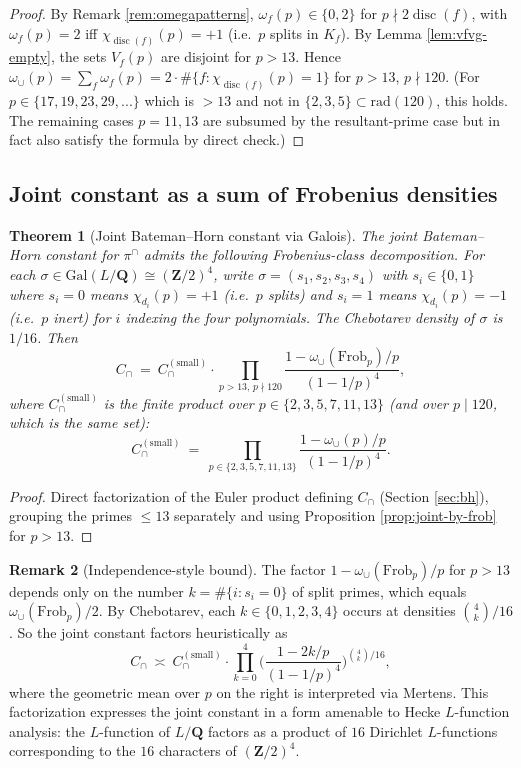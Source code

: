 \documentclass[11pt]{article}
\newtheorem{theorem}{Theorem}[section]
\theoremstyle{definition}
\newtheorem{remark}[theorem]{Remark}
\newcommand{\Z}{\mathbf{Z}}
\newcommand{\Q}{\mathbf{Q}}
\DeclareMathOperator{\disc}{disc}
\begin{document}
\begin{proof}
By Remark \ref{rem:omegapatterns}, $\omega_f(p)\in\{0,2\}$ for $p\nmid 2\disc(f)$, with $\omega_f(p)=2$ iff $\chi_{\disc(f)}(p)=+1$ (i.e.\ $p$ splits in $K_f$). By Lemma \ref{lem:vfvg-empty}, the sets $V_f(p)$ are disjoint for $p>13$. Hence $\omega_\cup(p)=\sum_f\omega_f(p)=2\cdot\#\{f:\chi_{\disc(f)}(p)=1\}$ for $p>13$, $p\nmid 120$. (For $p\in\{17,19,23,29,...\}$ which is $>13$ and not in $\{2,3,5\}\subset\mathrm{rad}(120)$, this holds. The remaining cases $p=11,13$ are subsumed by the resultant-prime case but in fact also satisfy the formula by direct check.)
\end{proof}

\subsection{Joint constant as a sum of Frobenius densities}

\begin{theorem}[Joint Bateman--Horn constant via Galois]\label{thm:joint-by-galois}
The joint Bateman--Horn constant for $\pi^\cap$ admits the following Frobenius-class decomposition. For each $\sigma\in\mathrm{Gal}(L/\Q)\cong(\Z/2)^4$, write $\sigma=(s_1,s_2,s_3,s_4)$ with $s_i\in\{0,1\}$ where $s_i=0$ means $\chi_{d_i}(p)=+1$ (i.e.\ $p$ splits) and $s_i=1$ means $\chi_{d_i}(p)=-1$ (i.e.\ $p$ inert) for $i$ indexing the four polynomials. The Chebotarev density of $\sigma$ is $1/16$. Then
\[
C_\cap\ =\ C_\cap^{(\text{small})}\cdot\prod_{p>13,\,p\nmid 120}\frac{1-\omega_\cup(\mathrm{Frob}_p)/p}{(1-1/p)^4},
\]
where $C_\cap^{(\text{small})}$ is the finite product over $p\in\{2,3,5,7,11,13\}$ (and over $p\mid 120$, which is the same set):
\[
C_\cap^{(\text{small})}\ =\ \prod_{p\in\{2,3,5,7,11,13\}} \frac{1-\omega_\cup(p)/p}{(1-1/p)^4}.
\]
\end{theorem}

\begin{proof}
Direct factorization of the Euler product defining $C_\cap$ (Section \ref{sec:bh}), grouping the primes $\le 13$ separately and using Proposition \ref{prop:joint-by-frob} for $p>13$.
\end{proof}

\begin{remark}[Independence-style bound]
The factor $1-\omega_\cup(\mathrm{Frob}_p)/p$ for $p>13$ depends only on the number $k=\#\{i:s_i=0\}$ of split primes, which equals $\omega_\cup(\mathrm{Frob}_p)/2$. By Chebotarev, each $k\in\{0,1,2,3,4\}$ occurs at densities $\binom{4}{k}/16$. So the joint constant factors heuristically as
\[
C_\cap\ \asymp\ C_\cap^{(\text{small})}\cdot\prod_{k=0}^4\biggl(\frac{1-2k/p}{(1-1/p)^4}\biggr)^{\binom{4}{k}/16},
\]
where the geometric mean over $p$ on the right is interpreted via Mertens. This factorization expresses the joint constant in a form amenable to Hecke $L$-function analysis: the $L$-function of $L/\Q$ factors as a product of $16$ Dirichlet $L$-functions corresponding to the $16$ characters of $(\Z/2)^4$.
\end{remark}
\end{document}
